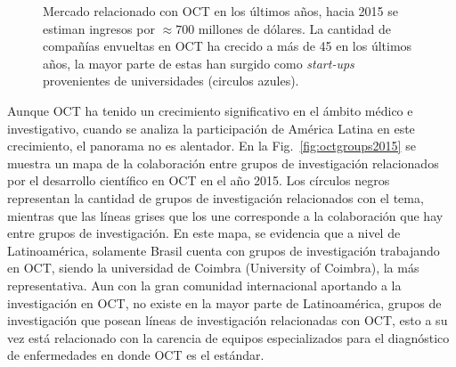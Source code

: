 \begin{figure}[ht!]
	\centering
	\caption[Mercado relacionado con OCT en los últimos años]{Mercado relacionado con OCT en los últimos años, hacia 2015 se estiman ingresos por $\approx700$ millones de dólares. La cantidad de compañías envueltas en OCT ha crecido a más de 45 en los últimos años, la mayor parte de estas han surgido como \textit{start-ups} provenientes de universidades (circulos azules).}
	\label{fig:octmarket}
\end{figure}

Aunque OCT ha tenido un crecimiento significativo en el ámbito médico e investigativo, cuando se analiza la participación de América Latina en este crecimiento, el panorama no es alentador. En la Fig.~\ref{fig:octgroups2015} se muestra un mapa de la colaboración entre grupos de investigación relacionados por el desarrollo científico en OCT en el año 2015. Los círculos negros representan la cantidad de grupos de investigación relacionados con el tema, mientras que las líneas grises que los une corresponde a la colaboración que hay entre grupos de investigación. En este mapa, se evidencia que a nivel de Latinoamérica, solamente Brasil cuenta con grupos de investigación trabajando en OCT, siendo la universidad de Coimbra (University of Coimbra), la más representativa. Aun con la gran comunidad internacional aportando a la investigación en OCT, no existe en la mayor parte de Latinoamérica, grupos de investigación que posean líneas de investigación relacionadas con OCT, esto a su vez está relacionado con la carencia de equipos especializados para el diagnóstico de enfermedades en donde OCT es el estándar. 

